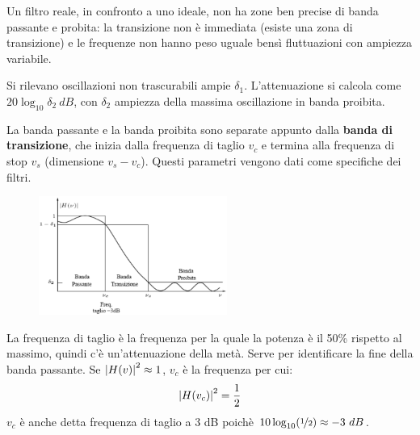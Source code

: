 Un filtro reale, in confronto a uno ideale, non ha zone ben precise di banda passante e probita: la transizione non è immediata (esiste una zona di transizione) e le frequenze non hanno peso uguale bensì fluttuazioni con ampiezza variabile. 

Si rilevano oscillazioni non trascurabili ampie $\delta_1$. L'attenuazione si calcola come $20\log_{10} \delta_2\ dB$, con $\delta_2$ ampiezza della massima oscillazione in banda proibita. 

La banda passante e la banda proibita sono separate appunto dalla \textbf{banda di transizione}, che inizia dalla frequenza di taglio $v_c$ e termina alla frequenza di stop $v_s$ (dimensione $v_s - v_c$). Questi parametri vengono dati come specifiche dei filtri. 

\begin{figure}
	\vspace{-15pt}
	\includegraphics[width=0.55\textwidth]{Lezioni/Immagini/taglio}
	\vspace{-50pt}
\end{figure}

La frequenza di taglio è la frequenza per la quale la potenza è il 50\% rispetto al massimo, quindi c'è un'attenuazione della metà. Serve per identificare la fine della banda passante. Se $\left|H(v)\right|^2 \approx 1$, $v_c$ è la frequenza per cui:
$$\left|H(v_c)\right|^2 = \frac{1}{2}$$
$v_c$ è anche detta frequenza di taglio a 3 dB poichè $10\log_{10}(\nicefrac{1}{2}) \approx -3\ dB$.
\bigskip
\bigskip